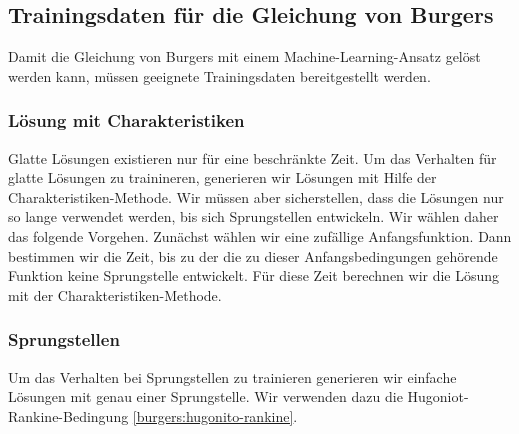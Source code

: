 %
%
%
\subsection{Trainingsdaten für die Gleichung von Burgers\label{burgers:training}}
Damit die Gleichung von Burgers mit einem Machine-Learning-Ansatz gelöst
werden kann, müssen geeignete Trainingsdaten bereitgestellt werden.


\subsubsection{Lösung mit Charakteristiken}
Glatte Lösungen existieren nur für eine beschränkte Zeit.
Um das Verhalten für glatte Lösungen zu trainineren, generieren
wir Lösungen mit Hilfe der Charakteristiken-Methode.
Wir müssen aber sicherstellen, dass die Lösungen nur so lange verwendet
werden, bis sich Sprungstellen entwickeln.
Wir wählen daher das folgende Vorgehen.
Zunächst wählen wir eine zufällige Anfangsfunktion.
Dann bestimmen wir die Zeit, bis zu der die zu dieser Anfangsbedingungen
gehörende Funktion keine Sprungstelle entwickelt.
Für diese Zeit berechnen wir die Lösung mit der Charakteristiken-Methode.

\subsubsection{Sprungstellen}
Um das Verhalten bei Sprungstellen zu trainieren generieren wir
einfache Lösungen mit genau einer Sprungstelle.
Wir verwenden dazu die Hugoniot-Rankine-Bedingung \eqref{burgers:hugonito-rankine}.

